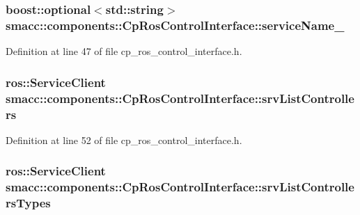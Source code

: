 \subsubsection[{\texorpdfstring{service\+Name\+\_\+}{serviceName_}}]{\setlength{\rightskip}{0pt plus 5cm}boost\+::optional$<$std\+::string$>$ smacc\+::components\+::\+Cp\+Ros\+Control\+Interface\+::service\+Name\+\_\+}\hypertarget{classsmacc_1_1components_1_1CpRosControlInterface_ac7831d58e5de5a78ff0baeb876f9157b}{}\label{classsmacc_1_1components_1_1CpRosControlInterface_ac7831d58e5de5a78ff0baeb876f9157b}


Definition at line 47 of file cp\+\_\+ros\+\_\+control\+\_\+interface.\+h.

\subsubsection[{\texorpdfstring{srv\+List\+Controllers}{srvListControllers}}]{\setlength{\rightskip}{0pt plus 5cm}ros\+::\+Service\+Client smacc\+::components\+::\+Cp\+Ros\+Control\+Interface\+::srv\+List\+Controllers\hspace{0.3cm}{\ttfamily [private]}}\hypertarget{classsmacc_1_1components_1_1CpRosControlInterface_aec2d2eb63ad4f04741493329e6c33696}{}\label{classsmacc_1_1components_1_1CpRosControlInterface_aec2d2eb63ad4f04741493329e6c33696}


Definition at line 52 of file cp\+\_\+ros\+\_\+control\+\_\+interface.\+h.

\subsubsection[{\texorpdfstring{srv\+List\+Controllers\+Types}{srvListControllersTypes}}]{\setlength{\rightskip}{0pt plus 5cm}ros\+::\+Service\+Client smacc\+::components\+::\+Cp\+Ros\+Control\+Interface\+::srv\+List\+Controllers\+Types\hspace{0.3cm}{\ttfamily [private]}}\hypertarget{classsmacc_1_1components_1_1CpRosControlInterface_a5a4983fca48da646b5fc94ce1f0e4114}{}\label{classsmacc_1_1components_1_1CpRosControlInterface_a5a4983fca48da646b5fc94ce1f0e4114}


